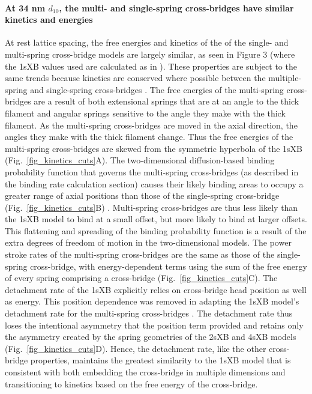 \documentclass[]{article}
\begin{document}
\paragraph{At 34 nm $d_{10}$, the multi- and single-spring cross-bridges have similar kinetics and energies} %
At rest lattice spacing, the free energies and kinetics of the of the single- and multi-spring cross-bridge models are largely similar, as seen in Figure 3 (where the 1sXB values used are calculated as in \citet[Fig.~10]{Tanner2007}).  
These properties are subject to the same trends because kinetics are conserved where possible between the multiple-spring and single-spring cross-bridges \citep{Pate1989}.
The free energies of the multi-spring cross-bridges are a result of both extensional springs that are at an angle to the thick filament and angular springs sensitive to the angle they make with the thick filament. 
As the multi-spring cross-bridges are moved in the axial direction, the angles they make with the thick filament change. 
Thus the free energies of the multi-spring cross-bridges are skewed from the symmetric hyperbola of the 1sXB (Fig.~\ref{fig_kinetics_cuts}A).
The two-dimensional diffusion-based binding probability function that governs the multi-spring cross-bridges (as described in the binding rate calculation section) causes their likely binding areas to occupy a greater range of axial positions than those of the single-spring cross-bridge (Fig.~\ref{fig_kinetics_cuts}B) \citep{BergBook, DillBook}.
Multi-spring cross-bridges are thus less likely than the 1sXB model to bind at a small offset, but more likely to bind at larger offsets. 
This flattening and spreading of the binding probability function is a result of the extra degrees of freedom of motion in the two-dimensional models. 
The power stroke rates of the multi-spring cross-bridges are the same as those of the single-spring cross-bridge, with energy-dependent terms using the sum of the free energy of every spring comprising a cross-bridge (Fig.~\ref{fig_kinetics_cuts}C). 
The detachment rate of the 1sXB explicitly relies on cross-bridge head position as well as energy.
This position dependence was removed in adapting the 1sXB model's detachment rate for the multi-spring cross-bridges . 
The detachment rate thus loses the intentional asymmetry that the position term provided and retains only the asymmetry created by the spring geometries of the 2sXB and 4sXB models (Fig.~\ref{fig_kinetics_cuts}D). 
Hence, the detachment rate, like the other cross-bridge properties, maintains the greatest similarity to the 1sXB model that is consistent with both embedding the cross-bridge in multiple dimensions and transitioning to kinetics based on the free energy of the cross-bridge. 
\end{document}
